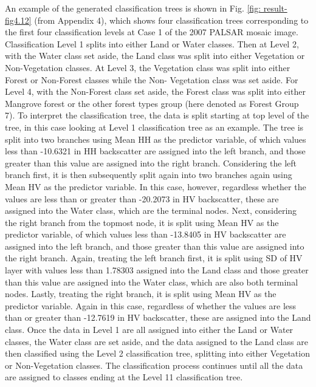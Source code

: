 An example of the generated classification trees is shown in Fig. \ref{fig: result-fig4.12} (from Appendix 4), which shows four classification trees corresponding to the first four classification levels at Case 1 of the 2007 PALSAR mosaic image. Classification Level 1 splits into either Land or Water classes. Then at Level 2, with the Water class set aside, the Land class was split into either Vegetation or Non-Vegetation classes. At Level 3, the Vegetation class was split into either Forest or Non-Forest classes while the Non- Vegetation class was set aside. For Level 4, with the Non-Forest class set aside, the Forest class was split into either Mangrove forest or the other forest types group (here denoted as Forest Group 7). To interpret the classification tree, the data is split starting at top level of the tree, in this case looking at Level 1 classification tree as an example. The tree is split into two branches using Mean HH as the predictor variable, of which values less than -10.6321 in HH backscatter are assigned into the left branch, and those greater than this value are assigned into the right branch. Considering the left branch first, it is then subsequently split again into two branches again using Mean HV as the predictor variable. In this case, however, regardless whether the values are less than or greater than -20.2073 in HV backscatter, these are assigned into the Water class, which are the terminal nodes. Next, considering the right branch from the topmost node, it is split using Mean HV as the predictor variable, of which values less than -13.8405 in HV backscatter are assigned into the left branch, and those greater than this value are assigned into the right branch. Again, treating the left branch first, it is split using SD of HV layer with values less than 1.78303 assigned into the Land class and those greater than this value are assigned into the Water class, which are also both terminal nodes. Lastly, treating the right branch, it is split using Mean HV as the predictor variable. Again in this case, regardless of whether the values are less than or greater than -12.7619 in HV backscatter, these are assigned into the Land class. Once the data in Level 1 are all assigned into either the Land or Water classes, the Water class are set aside, and the data assigned to the Land class are then classified using the Level 2 classification tree, splitting into either Vegetation or Non-Vegetation classes. The classification process continues until all the data are assigned to classes ending at the Level 11 classification tree.

